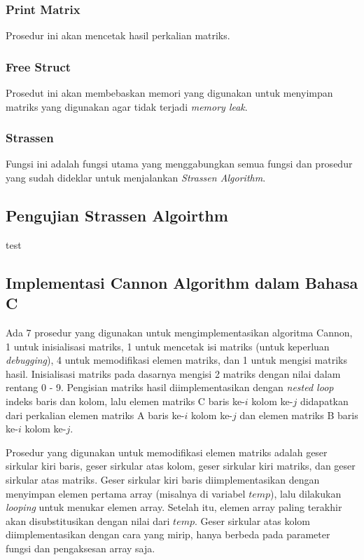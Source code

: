\documentclass[conference]{IEEEtran}
\begin{document}
\subsubsection{Print Matrix} Prosedur ini akan mencetak hasil perkalian matriks.

\subsubsection{Free Struct} Prosedut ini akan membebaskan memori yang digunakan untuk menyimpan matriks yang digunakan agar tidak terjadi \textit{memory leak}.

\subsubsection{Strassen} Fungsi ini adalah fungsi utama yang menggabungkan semua fungsi dan prosedur yang sudah dideklar untuk menjalankan \textit{Strassen Algorithm}.

\subsection{Pengujian Strassen Algoirthm}
test

\subsection{Implementasi Cannon Algorithm dalam Bahasa C}
Ada 7 prosedur yang digunakan untuk mengimplementasikan algoritma Cannon, 1 untuk inisialisasi matriks, 1 untuk mencetak isi matriks (untuk keperluan \textit{debugging}), 
4 untuk memodifikasi elemen matriks, dan 1 untuk mengisi matriks hasil.
Inisialisasi matriks pada dasarnya mengisi 2 matriks dengan nilai dalam rentang 0 - 9.
Pengisian matriks hasil diimplementasikan dengan \textit{nested loop} indeks baris dan kolom, 
lalu elemen matriks C baris ke-$i$ kolom ke-$j$ didapatkan dari perkalian elemen matriks A baris ke-$i$ kolom ke-$j$ dan elemen matriks B baris ke-$i$ kolom ke-$j$.

Prosedur yang digunakan untuk memodifikasi elemen matriks adalah geser sirkular kiri baris, geser sirkular atas kolom, geser sirkular kiri matriks, dan geser sirkular atas matriks.
Geser sirkular kiri baris diimplementasikan dengan menyimpan elemen pertama array (misalnya di variabel $temp$), lalu dilakukan \textit{looping} untuk menukar elemen array.
Setelah itu, elemen array paling terakhir akan disubstitusikan dengan nilai dari $temp$.
Geser sirkular atas kolom diimplementasikan dengan cara yang mirip, hanya berbeda pada parameter fungsi dan pengaksesan array saja.
\end{document}
